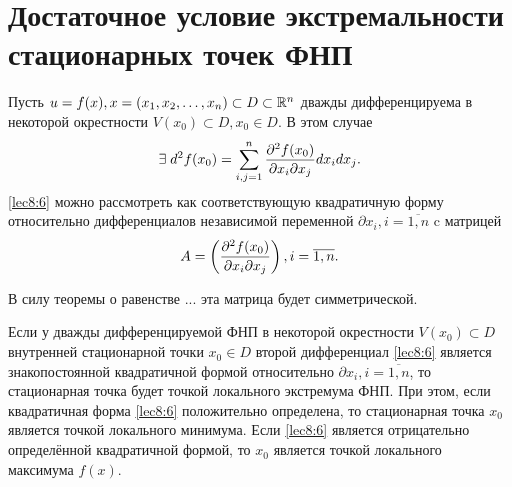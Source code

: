 \documentclass[../../main.tex]{subfiles}
\begin{document}
	\section{Достаточное условие экстремальности стационарных точек ФНП}
	Пусть $u = f(x), x = (x_1, x_2, \ldots, x_n) \subset D \subset \mathbb{R}^n$
	дважды дифференцируема в некоторой окрестности $V(x_0) \subset D, x_0 
\in D$. В этом случае 
\begin{equation}
\exists \; 
d^2f(x_0) = \sum_{i, j = 1}^n\frac{\partial ^2f(x_0)}{\partial x_i\partial x_j}dx_idx_j. 
\label{lec8:6}
\end{equation}
\eqref{lec8:6} можно рассмотреть как соответствующую квадратичную форму 
относительно дифференциалов независимой переменной $\partial x_i, i = 
\overline{1, n}$ c матрицей \[A = \left(\frac{\partial ^2f(x_0)}{\partial x_i\partial 
x_j}\right), i = \overline{1,n}. \]

В силу теоремы о равенстве 
...
эта матрица будет симметрической.

\begin{thm}
    Если у дважды дифференцируемой ФНП в некоторой окрестности 
$V(x_0) \subset D$ внутренней стационарной точки $x_0 \in D$ второй 
дифференциал \eqref{lec8:6} является знакопостоянной квадратичной формой
относительно $\partial x_i, i = \overline{1, n}$, то стационарная точка будет 
точкой локального экстремума ФНП. При этом, если квадратичная форма 
\eqref{lec8:6} положительно определена, то стационарная точка $x_0$ является 
точкой локального минимума. Если \eqref{lec8:6} является отрицательно 
определённой квадратичной формой, то $x_0$ является точкой локального
максимума $f(x)$.
\end{thm}
\end{document}
